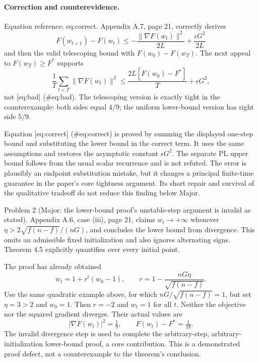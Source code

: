 \documentclass[10pt]{article}
\begin{document}
\paragraph*{Correction and counterevidence.}\mbox{}\par
Equation reference: eq:correct. Appendix A.7, page 21, correctly derives \[F(w_{t+1})-F(w_t)
 \leq-\frac{\|\nabla F(w_t)\|^2}{2L}+\frac{\epsilon G^2}{2L}\] and then the valid telescoping bound with \(F(w_0)-F(w_T)\). The next appeal to \(F(w_T)\geq F^*\) supports \[
 \frac1T\sum_{t<T}\|\nabla F(w_t)\|^2
 \leq\frac{2L[F(w_0)-F^*]}{T}+\epsilon G^2,\] not [eq:bad] (\#eq:bad). The telescoping version is exactly tight in the counterexample: both sides equal \(4/9\); the uniform lower-bound version has right side \(5/9\).\par
Equation [eq:correct] (\#eq:correct) is proved by summing the displayed one-step bound and substituting the lower bound in the correct term. It uses the same assumptions and restores the asymptotic constant \(\epsilon G^2\). The separate PL upper bound follows from the usual scalar recurrence and is not refuted. The error is plausibly an endpoint substitution mistake, but it changes a principal finite-time guarantee in the paper’s core tightness argument. Its short repair and survival of the qualitative tradeoff do not reduce this finding below Major.\par
Problem 2 (Major: the lower-bound proof’s unstable-step argument is invalid as stated).  Appendix A.6, case (iii), page 21, claims \(w_t\to+\infty\) whenever \(\eta>2\sqrt{f(n-f)}/(nG)\), and concludes the lower bound from divergence. This omits an admissible fixed initialization and also ignores alternating signs. Theorem 4.5 explicitly quantifies over every initial point.\par
The proof has already obtained \[w_t=1+r^t(w_0-1),\qquad
 r=1-\frac{nG\eta}{\sqrt{f(n-f)}}.\] Use the same quadratic example above, for which \(nG/\sqrt{f(n-f)}=1\), but set \(\eta=3>2\) and \(w_0=1\). Then \(r=-2\) and \(w_t=1\) for all \(t\). Neither the objective nor the squared gradient diverges. Their actual values are \[|\nabla F(w_t)|^2=\tfrac19,\qquad F(w_t)-F^*=\tfrac1{18}.\] The invalid divergence step is used to complete the arbitrary-step, arbitrary-initialization lower-bound proof, a core contribution. This is a demonstrated proof defect, not a counterexample to the theorem’s conclusion.\par
\end{document}
